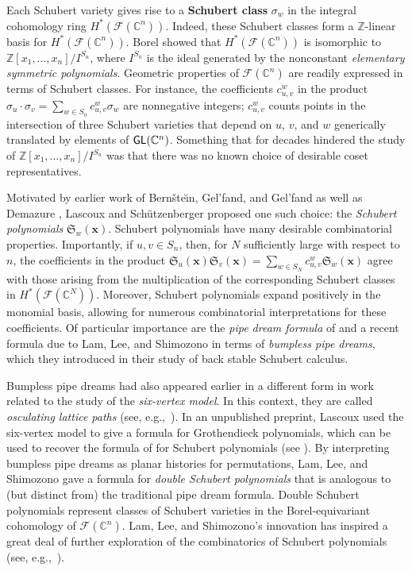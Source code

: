 \documentclass[12pt,reqno]{amsart}
\newtheorem{Main Conjecture}[theorem]{Main Conjecture}
\theoremstyle{remark}
\theoremstyle{plain}
\newcommand{\mydef}[1]{{\bf #1}}
\newcommand{\notdefterm}[1]{\emph{#1}}
\newcommand{\CC}{\mathbb{C}}
\newcommand{\fl}{{\mathcal F}}
\newcommand{\GL}{{\sf GL}}
\begin{document}
Each Schubert variety gives rise to a \mydef{Schubert class} $\sigma_w$ in the integral cohomology ring $H^*(\fl(\CC^n))$.  Indeed, these Schubert classes form a $\mathbb Z$-linear basis for $H^*(\fl(\CC^n))$.
Borel \cite{Bor53} showed that $H^*(\fl(\CC^n))$ is isomorphic to $\mathbb Z[x_1,\ldots,x_n]/I^{S_n}$, where $I^{S_n}$ is the ideal generated by the nonconstant \notdefterm{elementary symmetric polynomials}.   Geometric properties of $\fl(\CC^n)$ are readily expressed in terms of Schubert classes. For instance, the coefficients $c^w_{u,v}$ in the product $\sigma_u\cdot\sigma_v=\sum_{w\in S_n} c_{u,v}^w\sigma_w$  are nonnegative integers; $c_{u,v}^w$ counts points in the intersection of three Schubert varieties that depend on $u$, $v$, and $w$ generically translated by elements of $\GL(\CC^n)$. Something that for decades hindered the study of $\mathbb Z[x_1,\ldots,x_n]/I^{S_n}$ was that there was no known choice of desirable coset representatives. 

Motivated by earlier work of Bern\v{s}te\u{\i}n, Gel'fand, and Gel'fand \cite{BGG73} as well as Demazure \cite{Dem74}, Lascoux and Sch\"utzenberger \cite{LS82} proposed one such choice: the \notdefterm{Schubert polynomials} $\mathfrak S_w(\mathbf x)$.  Schubert polynomials have many desirable combinatorial properties. Importantly, if $u, v \in S_n$, then, for $N$ sufficiently large with respect to $n$, the coefficients in the product $\mathfrak S_u(\mathbf x)\mathfrak S_v(\mathbf x)=\sum_{w \in S_N} c_{u,v}^w \mathfrak S_w(\mathbf x)$ agree with those arising from the multiplication of the corresponding Schubert classes in $H^*(\fl(\mathbb C^N))$.  Moreover, Schubert polynomials expand positively in the monomial basis, allowing for numerous combinatorial interpretations for these coefficients.  Of particular importance are the \emph{pipe dream formula} of \cite{BB93,BJS93,FK94,FS94} and a recent formula due to Lam, Lee, and Shimozono \cite{LLS21} in terms of \emph{bumpless pipe dreams}, which they introduced in their study of back stable Schubert calculus.  

Bumpless pipe dreams had also appeared earlier in a different form in work related to the study of the \notdefterm{six-vertex model}.  In this context, they are called \notdefterm{osculating lattice paths} (see, e.g.,\ \cite{Beh08}). In an unpublished preprint,  Lascoux \cite{Las} used the six-vertex model to give a formula for Grothendieck polynomials, which can be used to recover the formula of \cite{LLS21} for Schubert polynomials (see \cite{Wei21}).  By interpreting bumpless pipe dreams as planar histories for permutations, Lam, Lee, and Shimozono gave a formula for \emph{double Schubert polynomials} that is analogous to (but distinct from) the traditional pipe dream formula. Double Schubert polynomials represent classes of Schubert varieties in the Borel-equivariant cohomology of $\fl(\CC^n)$.  Lam, Lee, and Shimozono's innovation has inspired a great deal of further exploration of the combinatorics of Schubert polynomials (see, e.g.,\ \cite{FGS18,BS20,Hua20,Wei21, HPW, Hua21}).
\end{document}
